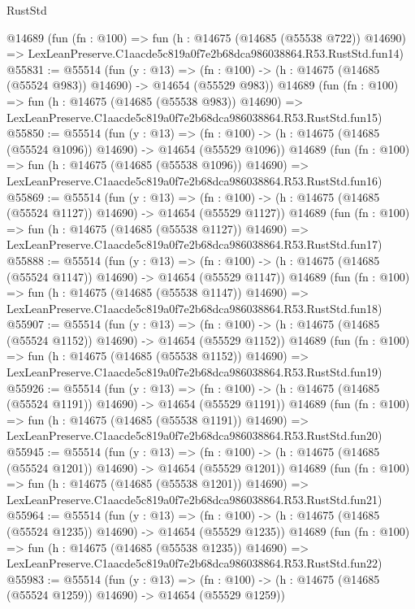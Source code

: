 \begin{lexlean}{RustStd}
\begin{coremodule}
    @14689
    (fun (fn : @100) =>
    fun (h : @14675 (@14685 (@55538 @722)) @14690) =>
    LexLeanPreserve.C1aacde5c819a0f7e2b68dca986038864.R53.RustStd.fun14)
@55831 := @55514
    (fun (y : @13) =>
    (fn : @100) -> (h : @14675 (@14685 (@55524 @983)) @14690) -> @14654 (@55529 @983))
    @14689
    (fun (fn : @100) =>
    fun (h : @14675 (@14685 (@55538 @983)) @14690) =>
    LexLeanPreserve.C1aacde5c819a0f7e2b68dca986038864.R53.RustStd.fun15)
@55850 := @55514
    (fun (y : @13) =>
    (fn : @100) -> (h : @14675 (@14685 (@55524 @1096)) @14690) -> @14654 (@55529 @1096))
    @14689
    (fun (fn : @100) =>
    fun (h : @14675 (@14685 (@55538 @1096)) @14690) =>
    LexLeanPreserve.C1aacde5c819a0f7e2b68dca986038864.R53.RustStd.fun16)
@55869 := @55514
    (fun (y : @13) =>
    (fn : @100) -> (h : @14675 (@14685 (@55524 @1127)) @14690) -> @14654 (@55529 @1127))
    @14689
    (fun (fn : @100) =>
    fun (h : @14675 (@14685 (@55538 @1127)) @14690) =>
    LexLeanPreserve.C1aacde5c819a0f7e2b68dca986038864.R53.RustStd.fun17)
@55888 := @55514
    (fun (y : @13) =>
    (fn : @100) -> (h : @14675 (@14685 (@55524 @1147)) @14690) -> @14654 (@55529 @1147))
    @14689
    (fun (fn : @100) =>
    fun (h : @14675 (@14685 (@55538 @1147)) @14690) =>
    LexLeanPreserve.C1aacde5c819a0f7e2b68dca986038864.R53.RustStd.fun18)
@55907 := @55514
    (fun (y : @13) =>
    (fn : @100) -> (h : @14675 (@14685 (@55524 @1152)) @14690) -> @14654 (@55529 @1152))
    @14689
    (fun (fn : @100) =>
    fun (h : @14675 (@14685 (@55538 @1152)) @14690) =>
    LexLeanPreserve.C1aacde5c819a0f7e2b68dca986038864.R53.RustStd.fun19)
@55926 := @55514
    (fun (y : @13) =>
    (fn : @100) -> (h : @14675 (@14685 (@55524 @1191)) @14690) -> @14654 (@55529 @1191))
    @14689
    (fun (fn : @100) =>
    fun (h : @14675 (@14685 (@55538 @1191)) @14690) =>
    LexLeanPreserve.C1aacde5c819a0f7e2b68dca986038864.R53.RustStd.fun20)
@55945 := @55514
    (fun (y : @13) =>
    (fn : @100) -> (h : @14675 (@14685 (@55524 @1201)) @14690) -> @14654 (@55529 @1201))
    @14689
    (fun (fn : @100) =>
    fun (h : @14675 (@14685 (@55538 @1201)) @14690) =>
    LexLeanPreserve.C1aacde5c819a0f7e2b68dca986038864.R53.RustStd.fun21)
@55964 := @55514
    (fun (y : @13) =>
    (fn : @100) -> (h : @14675 (@14685 (@55524 @1235)) @14690) -> @14654 (@55529 @1235))
    @14689
    (fun (fn : @100) =>
    fun (h : @14675 (@14685 (@55538 @1235)) @14690) =>
    LexLeanPreserve.C1aacde5c819a0f7e2b68dca986038864.R53.RustStd.fun22)
@55983 := @55514
    (fun (y : @13) =>
    (fn : @100) -> (h : @14675 (@14685 (@55524 @1259)) @14690) -> @14654 (@55529 @1259))

\end{coremodule}
\end{lexlean}
